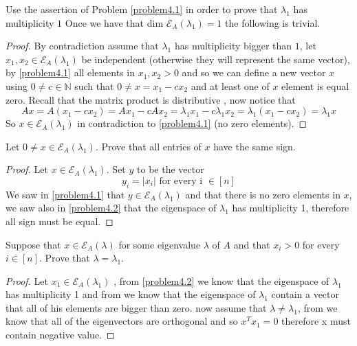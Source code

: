 \documentclass[a4paper, 11pt, oneside]{article}
\newenvironment{problem}[1]
  {\renewcommand\theinnercustomprob{#1}\innercustomprob}
  {\endinnercustomprob}
\newcommand{\N}{\mathbb{N}}
\newcommand\abs[1]{\left|#1\right|}
\begin{document}
\begin{problem}{4.2}\label{problem4.2}
Use the assertion of Problem \ref{problem4.1} in order to prove that $\lambda_1$ has multiplicity $1$
Once we have that dim $\mathcal{E}_A(\lambda_1) = 1$ the following is trivial.
\end{problem}

\begin{proof}
By contradiction assume that $\lambda_1$ has multiplicity bigger than $1$,
let $x_1,x_2 \in \mathcal{E}_A(\lambda_1)$ be independent (otherwise they will represent the same vector), by \ref{problem4.1} all elements in $x_1,x_2 > 0$ and so we can define a new vector $x$ using $0 \neq c \in \N$ such that $0 \neq x = x_1 - c x_2$ and at least one of $x$ element is equal zero.
Recall that the matrix product is distributive \cite{matrix_multiplication}, now notice that 
\begin{equation*}
 Ax = A(x_1 - c x_2) = Ax_1 - cAx_2= \lambda_1 x_1 - c\lambda_1 x_2 = \lambda_1 (x_1 -cx_2) = \lambda_1 x
\end{equation*}
So $x \in  \mathcal{E}_A(\lambda_1)$ in contradiction to \ref{problem4.1} (no zero elements).
\end{proof}

\begin{problem}{4.3}\label{problem4.3}
Let $0 \neq x \in \mathcal{E}_A(\lambda_1)$. Prove that all entries of $x$ have the same sign.
\end{problem}

\begin{proof}
Let $x \in \mathcal{E}_A(\lambda_1)$. Set $y$ to be the vector 
\begin{equation*}
y_i = \abs{x_i} \text{ for every i } \in [n]
\end{equation*}
We saw in \ref{problem4.1} that  $y \in \mathcal{E}_A(\lambda_1)$ and that there is no zero elements in $x$, we saw also in \ref{problem4.2} that the eigenspace of $\lambda_1$ has multiplicity 1, therefore all sign must be equal. 
\end{proof}

\begin{problem}{4.4}\label{problem4.4}
Suppose that $x \in \mathcal{E}_A(\lambda)$ for some eigenvalue $\lambda$ of $A$ and that $x_i > 0$ for every $i \in [n]$.
Prove that $\lambda = \lambda_1$.
\end{problem}

\begin{proof}
Let $x_1 \in \mathcal{E}_A(\lambda_1)$ , from \ref{problem4.2} we know that the eigenspace of $\lambda_1$ has multiplicity 1  and from \cite{perron_frobenius} we know that the eigenspace of $\lambda_1$ contain a vector that all of his elements are bigger than zero.
now assume that $\lambda \neq \lambda_1$, from \cite{orthogonal_eigenvectors} we know that all of the eigenvectors are orthogonal and so $x^Tx_1 = 0$ therefore x must contain negative value.
\end{proof}
\end{document}
